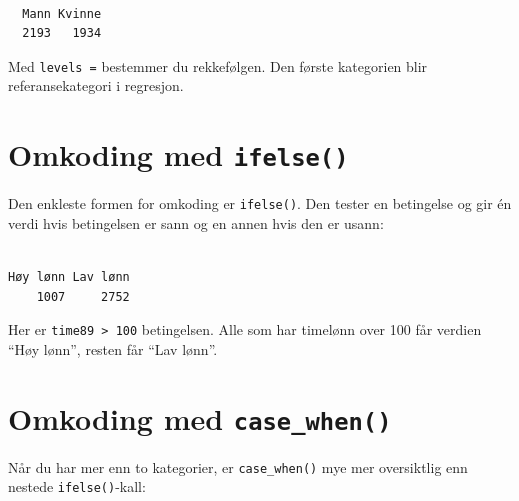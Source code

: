 \documentclass[
  norsk,
  letterpaper,
  DIV=11,
  numbers=noendperiod]{scrreprt}
\newenvironment{Shaded}{\begin{snugshade}}{\end{snugshade}}
\newcommand{\AttributeTok}[1]{\textcolor[rgb]{0.40,0.45,0.13}{#1}}
\newcommand{\DecValTok}[1]{\textcolor[rgb]{0.68,0.00,0.00}{#1}}
\newcommand{\FunctionTok}[1]{\textcolor[rgb]{0.28,0.35,0.67}{#1}}
\newcommand{\NormalTok}[1]{\textcolor[rgb]{0.00,0.23,0.31}{#1}}
\newcommand{\OtherTok}[1]{\textcolor[rgb]{0.00,0.23,0.31}{#1}}
\newcommand{\SpecialCharTok}[1]{\textcolor[rgb]{0.37,0.37,0.37}{#1}}
\newcommand{\StringTok}[1]{\textcolor[rgb]{0.13,0.47,0.30}{#1}}
\theoremstyle{definition}
\theoremstyle{remark}
\begin{document}
\begin{verbatim}

  Mann Kvinne 
  2193   1934 
\end{verbatim}

Med \texttt{levels\ =} bestemmer du rekkefølgen. Den første kategorien
blir referansekategori i regresjon.

\section{\texorpdfstring{Omkoding med
\texttt{ifelse()}}{Omkoding med ifelse()}}\label{omkoding-med-ifelse}

Den enkleste formen for omkoding er \texttt{ifelse()}. Den tester en
betingelse og gir én verdi hvis betingelsen er sann og en annen hvis den
er usann:

\begin{Shaded}
\end{Shaded}

\begin{verbatim}

Høy lønn Lav lønn 
    1007     2752 
\end{verbatim}

Her er \texttt{time89\ \textgreater{}\ 100} betingelsen. Alle som har
timelønn over 100 får verdien ``Høy lønn'', resten får ``Lav lønn''.

\section{\texorpdfstring{Omkoding med
\texttt{case\_when()}}{Omkoding med case\_when()}}\label{omkoding-med-case_when}

Når du har mer enn to kategorier, er \texttt{case\_when()} mye mer
oversiktlig enn nestede \texttt{ifelse()}-kall:
\end{document}
